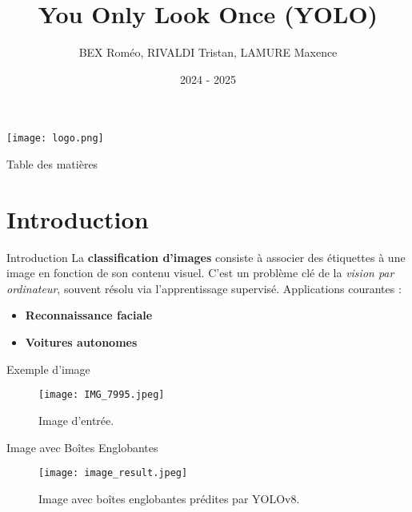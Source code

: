 \documentclass{beamer}
\title{You Only Look Once (YOLO)}
\author{BEX Roméo, RIVALDI Tristan, LAMURE Maxence}
\institute{Université de Montpellier \\
Master 2 Statistiques et Sciences des Données}
\date{2024 - 2025}
\begin{document}
\begin{frame}
    \titlepage
    \begin{center}
        \texttt{[image: logo.png]} %
    \end{center}
\end{frame}


\begin{frame}{Table des matières}
    \tableofcontents
\end{frame}

\section{Introduction}

\begin{frame}{Introduction}
    La \textbf{classification d'images} consiste à associer des étiquettes à une image en fonction de son contenu visuel. C'est un problème clé de la \textit{vision par ordinateur}, souvent résolu via l'apprentissage supervisé. Applications courantes :
    \begin{itemize}
        \item \textbf{Reconnaissance faciale}
        \item \textbf{Voitures autonomes}
    \end{itemize}
\end{frame}



\begin{frame}{Exemple d'image}
    \begin{figure}
        \centering
        \texttt{[image: IMG\_7995.jpeg]}
        \caption{Image d'entrée.}
    \end{figure}
\end{frame}

\begin{frame}{Image avec Boîtes Englobantes}
    \begin{figure}
        \centering
        \texttt{[image: image\_result.jpeg]}
        \caption{Image avec boîtes englobantes prédites par YOLOv8.}
    \end{figure}
\end{frame}
\end{document}

